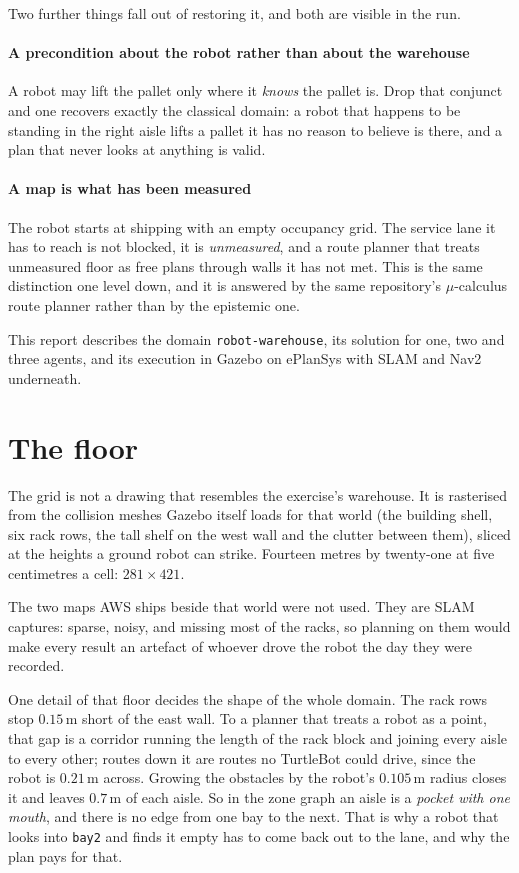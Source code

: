 \documentclass[11pt,a4paper]{article}
\theoremstyle{definition}
\newcommand{\code}[1]{\texttt{\small #1}}
\begin{document}
Two further things fall out of restoring it, and both are visible in the run.

\paragraph{A precondition about the robot rather than about the warehouse} A
robot may lift the pallet only where it \emph{knows} the pallet is. Drop that
conjunct and one recovers exactly the classical domain: a robot that happens to
be standing in the right aisle lifts a pallet it has no reason to believe is
there, and a plan that never looks at anything is valid.

\paragraph{A map is what has been measured} The robot starts at shipping with
an empty occupancy grid. The service lane it has to reach is not blocked, it is
\emph{unmeasured}, and a route planner that treats unmeasured floor as free
plans through walls it has not met. This is the same distinction one level
down, and it is answered by the same repository's $\mu$-calculus route planner
rather than by the epistemic one.

This report describes the domain \code{robot-warehouse}, its solution for one,
two and three agents, and its execution in Gazebo on ePlanSys with SLAM and
Nav2 underneath.

\section{The floor}

The grid is not a drawing that resembles the exercise's warehouse. It is
rasterised from the collision meshes Gazebo itself loads for that world (the
building shell, six rack rows, the tall shelf on the west wall and the clutter
between them), sliced at the heights a ground robot can strike. Fourteen
metres by twenty-one at five centimetres a cell: $281 \times 421$.

The two maps AWS ships beside that world were not used. They are SLAM captures:
sparse, noisy, and missing most of the racks, so planning on them would make
every result an artefact of whoever drove the robot the day they were recorded.

One detail of that floor decides the shape of the whole domain. The rack rows
stop $0.15$\,m short of the east wall. To a planner that treats a robot as a
point, that gap is a corridor running the length of the rack block and joining
every aisle to every other; routes down it are routes no TurtleBot could drive,
since the robot is $0.21$\,m across. Growing the obstacles by the robot's
$0.105$\,m radius closes it and leaves $0.7$\,m of each aisle. So in the zone
graph an aisle is a \emph{pocket with one mouth}, and there is no edge from one
bay to the next. That is why a robot that looks into \code{bay2} and finds it
empty has to come back out to the lane, and why the plan pays for that.
\end{document}

